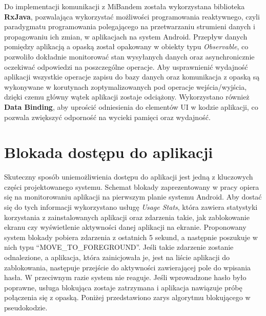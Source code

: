 \newline\newline
\indent Do implementacji komunikacji z MiBandem została wykorzystana biblioteka \textbf{RxJava}, pozwalająca wykorzystać możliwości programowania reaktywnego, czyli paradygmatu programowania polegającego na przetwarzaniu strumieni danych i propagowaniu ich zmian, w aplikacjach na system Android. Przepływ danych pomiędzy aplikacją a opaską został opakowany w obiekty typu \textit{Observable}, co pozwoliło dokładnie monitorować stan wysyłanych danych oraz asynchronicznie oczekiwać odpowiedzi na poszczególne operacje.
\newline\newline
\indent Aby usprawnienić wydajność aplikacji wszystkie operacje zapisu do bazy danych oraz komunikacja z opaską są wykonywane w korutynach zoptymalizowanych pod operacje wejścia/wyjścia, dzięki czemu główny wątek aplikacji zostaje odciążony. Wykorzystano również \textbf{Data Binding}, aby uprościć odniesienia do elementów UI w kodzie aplikacji, co pozwala zwiększyć odporność na wycieki pamięci oraz wydajność. 

\section{Blokada dostępu do aplikacji}
Skuteczny sposób uniemożliwienia dostępu do aplikacji jest jedną z kluczowych części projektowanego systemu. Schemat blokady zaprezentowany w pracy opiera się na monitorowaniu aplikacji na pierwszym planie systemu Android. Aby dostać się do tych informacji wykorzystano usługę \textit{Usage Stats}, która zawiera statystyki korzystania z zainstalowanych aplikacji oraz zdarzenia takie, jak zablokowanie ekranu czy wyświetlenie aktywności danej aplikacji na ekranie. Proponowany system blokady pobiera zdarzenia z ostatnich 5 sekund, a następnie poszukuje w nich typu ``MOVE\_TO\_FOREGROUND''. Jeśli takie zdarzenie zostanie odnalezione, a aplikacja, która zainicjowała je, jest na liście aplikacji do zablokowania, następuje przejście do aktywności zawierającej pole do wpisania hasła. W przeciwnym razie system nie reaguje. Jeśli wprowadzone hasło było poprawne, usługa blokująca zostaje zatrzymana i aplikacja nawiązuje próbę połączenia się z opaską. Poniżej przedstawiono zarys algorytmu blokującego w pseudokodzie.
\newline

